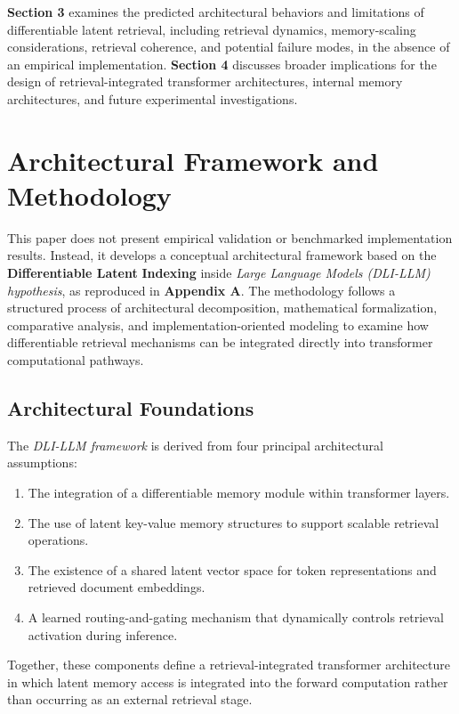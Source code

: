 \textbf{Section 3} examines the predicted architectural behaviors and limitations of differentiable latent retrieval, including retrieval dynamics, memory-scaling considerations, retrieval coherence, and potential failure modes, in the absence of an empirical implementation.
\textbf{Section 4} discusses broader implications for the design of retrieval-integrated transformer architectures, internal memory architectures, and future experimental investigations.
\hypertarget{architectural-framework-and-methodology}{%
\section{Architectural Framework and Methodology}}
\label{architectural-framework-and-methodology}
This paper does not present empirical validation or benchmarked implementation results. Instead, it develops a conceptual architectural framework based on the \textbf{Differentiable Latent} \textbf{Indexing} inside \emph{Large Language Models (DLI-LLM) hypothesis}, as reproduced in \textbf{Appendix A}. The methodology follows a structured process of architectural decomposition, mathematical formalization, comparative analysis, and implementation-oriented modeling to examine how differentiable retrieval mechanisms can be integrated directly into transformer computational pathways.
\hypertarget{architectural-foundations}{%
\subsection{Architectural Foundations}}
\label{architectural-foundations}
The \emph{DLI-LLM framework} is derived from four principal architectural assumptions:
\begin{enumerate}
\item The integration of a differentiable memory module within transformer layers.
\item The use of latent key-value memory structures to support scalable retrieval operations.
\item The existence of a shared latent vector space for token representations and retrieved document embeddings.
\item A learned routing-and-gating mechanism that dynamically controls retrieval activation during inference.
\end{enumerate}
Together, these components define a retrieval-integrated transformer architecture in which latent memory access is integrated into the forward computation rather than occurring as an external retrieval stage.
